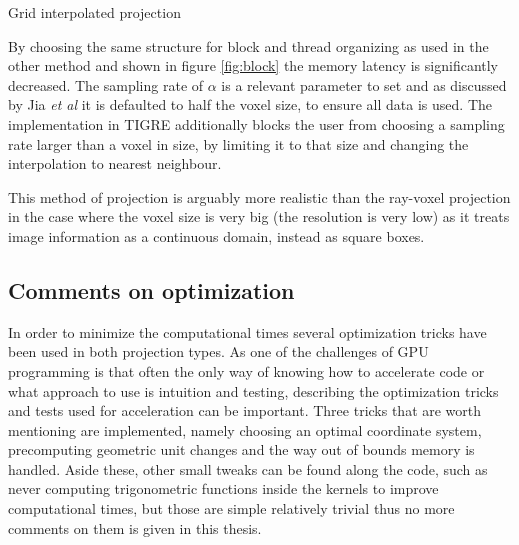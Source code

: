 \begin{algorithm}

\caption{Grid interpolated projection
\label{alg:gridinterp}}
\begin{algorithmic}[1]
    
\EndFor
{}
\EndKernel
\end{algorithmic}

\end{algorithm}


 By choosing the same structure for block and thread organizing as used in the other method and shown in figure \ref{fig:block} the memory latency is significantly decreased. The sampling rate of $\alpha$ is a relevant parameter to set and as discussed by Jia \textit{et al}\cite{jia2012gpu} it is defaulted to half the voxel size, to ensure all data is used. The implementation in TIGRE additionally blocks the user from choosing a sampling rate larger than a voxel in size, by limiting it to that size and changing the interpolation to nearest neighbour.

This method of projection is arguably more realistic than the ray-voxel projection in the case where the voxel size is very big (the resolution is very low) as it treats image information as a continuous domain, instead as square boxes.

\subsection{Comments on optimization}

In order to minimize the computational times several optimization tricks have been used in both projection types. As one of the challenges of GPU programming is that often the only way of knowing how to accelerate code or what approach to use is intuition and testing, describing the optimization tricks and tests used for acceleration can be important. Three tricks that are worth mentioning are implemented, namely choosing an optimal coordinate system, precomputing geometric unit changes and the way out of bounds memory is handled. Aside these, other small tweaks can be found along the code, such as never computing trigonometric functions inside the kernels to improve computational times, but those are simple relatively trivial thus no more comments on them is given in this thesis.

